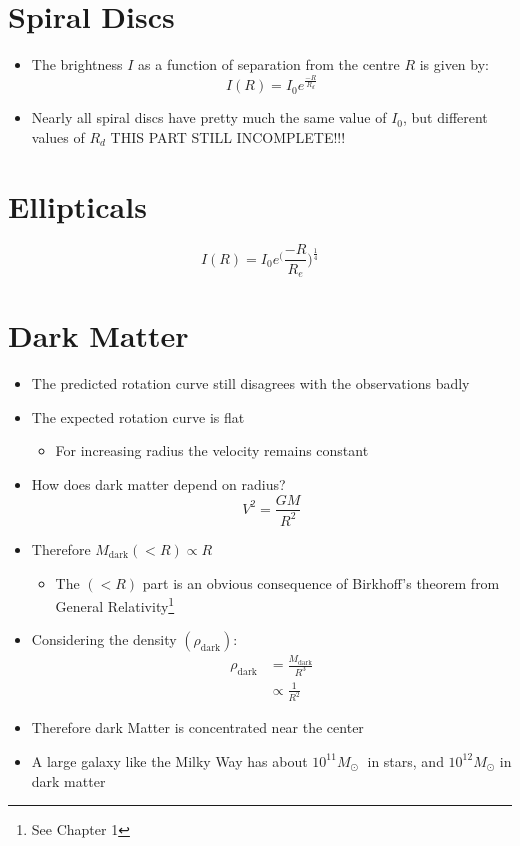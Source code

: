 \documentclass{article}
\begin{document}
\section{Spiral Discs}
\begin{itemize}
\item The brightness $I$ as a function of separation from the centre $R$ is given by:
\begin{equation}
I(R)=I_0e^{\frac{-R}{R_d}}
\end{equation}
\item Nearly all spiral discs have pretty much the same value of $I_0$, but different values
of $R_d$
THIS PART STILL INCOMPLETE!!!
\end{itemize}
\section{Ellipticals}
\begin{equation}
I(R)=I_0e^({\frac{-R}{R_e})^{\frac{1}{4}}}
\end{equation}
\section{Dark Matter}
\begin{itemize}
\item The predicted rotation curve still disagrees with the observations badly
\item The expected rotation curve is flat
\begin{itemize}
\item For increasing radius the velocity remains constant
\end{itemize}
\item How does dark matter depend on radius?
\begin{equation}
V^2=\frac{GM}{R^2}
\end{equation}
\item Therefore $M_\text{dark}(<R) \propto R$
\begin{itemize}
\item The $(<R)$ part is an obvious consequence of Birkhoff's theorem from General Relativity\footnote{See Chapter 1}
\end{itemize}
\item Considering the density $(\rho_\text{dark})$:
\begin{align}
\rho_\text{dark}&=\frac{M_\text{dark}}{R^3}\\
& \propto \frac{1}{R^2}
\end{align}
\item Therefore dark Matter is concentrated near the center
\item A large galaxy like the Milky Way has about $10^{11}M_\odot$ in stars, and $10^{12}M_\odot$ in dark matter
\end{itemize}
\end{document}
